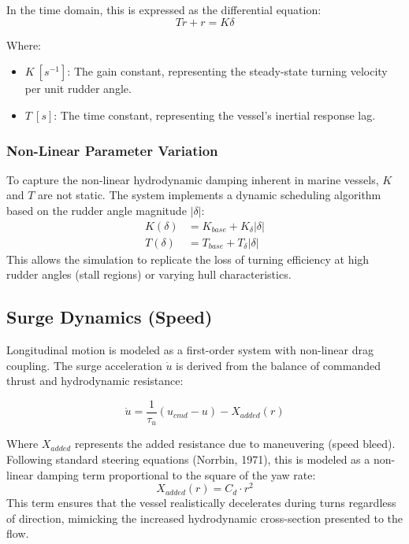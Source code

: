 \documentclass[12pt, a4paper, oneside]{report}
\begin{document}
In the time domain, this is expressed as the differential equation:
\begin{equation}
    T \dot{r} + r = K \delta
\end{equation}

Where:
\begin{itemize}
    \item $K \ [s^{-1}]$: The gain constant, representing the steady-state turning velocity per unit rudder angle.
    \item $T \ [s]$: The time constant, representing the vessel's inertial response lag.
\end{itemize}

\subsubsection{Non-Linear Parameter Variation}
To capture the non-linear hydrodynamic damping inherent in marine vessels, $K$ and $T$ are not static. The system implements a dynamic scheduling algorithm based on the rudder angle magnitude $|\delta|$:
\begin{align}
    K(\delta) &= K_{base} + K_{\delta} |\delta| \\
    T(\delta) &= T_{base} + T_{\delta} |\delta|
\end{align}
This allows the simulation to replicate the loss of turning efficiency at high rudder angles (stall regions) or varying hull characteristics.

\subsection{Surge Dynamics (Speed)}
Longitudinal motion is modeled as a first-order system with non-linear drag coupling. The surge acceleration $\dot{u}$ is derived from the balance of commanded thrust and hydrodynamic resistance:

\begin{equation}
    \dot{u} = \frac{1}{\tau_u} (u_{cmd} - u) - X_{added}(r)
\end{equation}

Where $X_{added}$ represents the added resistance due to maneuvering (speed bleed). Following standard steering equations (Norrbin, 1971), this is modeled as a non-linear damping term proportional to the square of the yaw rate:
\begin{equation}
    X_{added}(r) = C_d \cdot r^2
\end{equation}
This term ensures that the vessel realistically decelerates during turns regardless of direction, mimicking the increased hydrodynamic cross-section presented to the flow.
\end{document}
